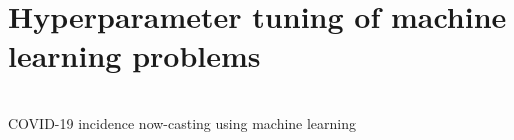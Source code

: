 \newcommand{\Ti}{\mbox{$T_1$}}
\newcommand{\nh}{\mbox{$n_\text{hidden}$}}
\newcommand{\Pd}{\mbox{$P_\text{dropout}$}}
\newcommand{\nla}{\mbox{$n_\text{layers}$}}
\newcommand{\Pt}{\mbox{$P_\text{teacher}$}}
\newcommand{\lr}{\mbox{$l_\text{rate}$}}
\newcommand{\bs}{\mbox{$b_\text{size}$}}
\newcommand{\R}{\mbox{$\lambda$}}
\newcommand{\e}{\mbox{$\epsilon$}}
\newcommand{\etol}{\mbox{$\epsilon_\text{tol}$}}
\newcommand{\fs}{\mbox{$f_\text{sample}$}}
\newcommand{\ff}{\mbox{$f_\text{features}$}}
\newcommand{\D}{\mbox{$D$}}
\newcommand{\ns}{\mbox{$n_\text{stages}$}}
\newcommand{\nd}{\mbox{$n_\text{degree}$}}

\newcommand{\To}{\mbox{$T_2$}}
\newcommand{\np}{\mbox{$n_\text{patience}$}}
\newcommand{\nepoch}{\mbox{$n_\text{epochs}$}}
\newcommand{\nbest}{\mbox{$n_\text{epochs}^\text{best}$}}
\section{Hyperparameter tuning of machine learning problems}
\begin{frame}[c,noframenumbering]
	\centering
	\begin{titleblock}{}
		~\\%
		{\centering\LARGE COVID-19 incidence now-casting using machine learning\\}%
		~\\%
	\end{titleblock}
\end{frame}
